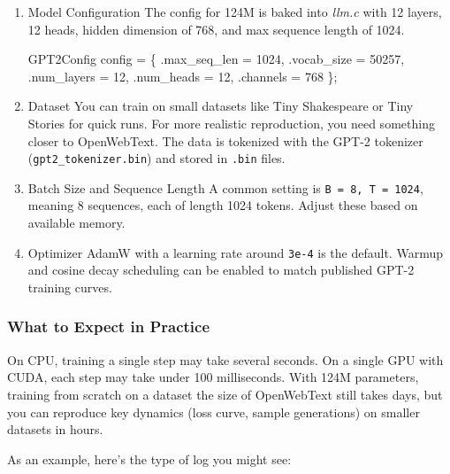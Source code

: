 \documentclass[
  letterpaper,
  DIV=11,
  numbers=noendperiod]{scrreprt}
\newenvironment{Shaded}{\begin{snugshade}}{\end{snugshade}}
\newcommand{\DecValTok}[1]{\textcolor[rgb]{0.68,0.00,0.00}{#1}}
\newcommand{\NormalTok}[1]{\textcolor[rgb]{0.00,0.23,0.31}{#1}}
\newcommand{\OperatorTok}[1]{\textcolor[rgb]{0.37,0.37,0.37}{#1}}
\begin{document}
\begin{enumerate}
\def\labelenumi{\arabic{enumi}.}
\item
  Model Configuration The config for 124M is baked into \emph{llm.c}
  with 12 layers, 12 heads, hidden dimension of 768, and max sequence
  length of 1024.

\begin{Shaded}
\begin{Highlighting}[]
\NormalTok{GPT2Config config }\OperatorTok{=} \OperatorTok{\{}
    \OperatorTok{.}\NormalTok{max\_seq\_len }\OperatorTok{=} \DecValTok{1024}\OperatorTok{,}
    \OperatorTok{.}\NormalTok{vocab\_size }\OperatorTok{=} \DecValTok{50257}\OperatorTok{,}
    \OperatorTok{.}\NormalTok{num\_layers }\OperatorTok{=} \DecValTok{12}\OperatorTok{,}
    \OperatorTok{.}\NormalTok{num\_heads }\OperatorTok{=} \DecValTok{12}\OperatorTok{,}
    \OperatorTok{.}\NormalTok{channels }\OperatorTok{=} \DecValTok{768}
\OperatorTok{\};}
\end{Highlighting}
\end{Shaded}
\item
  Dataset You can train on small datasets like Tiny Shakespeare or Tiny
  Stories for quick runs. For more realistic reproduction, you need
  something closer to OpenWebText. The data is tokenized with the GPT-2
  tokenizer (\texttt{gpt2\_tokenizer.bin}) and stored in \texttt{.bin}
  files.
\item
  Batch Size and Sequence Length A common setting is
  \texttt{B\ =\ 8,\ T\ =\ 1024}, meaning 8 sequences, each of length
  1024 tokens. Adjust these based on available memory.
\item
  Optimizer AdamW with a learning rate around \texttt{3e-4} is the
  default. Warmup and cosine decay scheduling can be enabled to match
  published GPT-2 training curves.
\end{enumerate}

\subsubsection{What to Expect in
Practice}\label{what-to-expect-in-practice}

On CPU, training a single step may take several seconds. On a single GPU
with CUDA, each step may take under 100 milliseconds. With 124M
parameters, training from scratch on a dataset the size of OpenWebText
still takes days, but you can reproduce key dynamics (loss curve, sample
generations) on smaller datasets in hours.

As an example, here's the type of log you might see:
\end{document}
